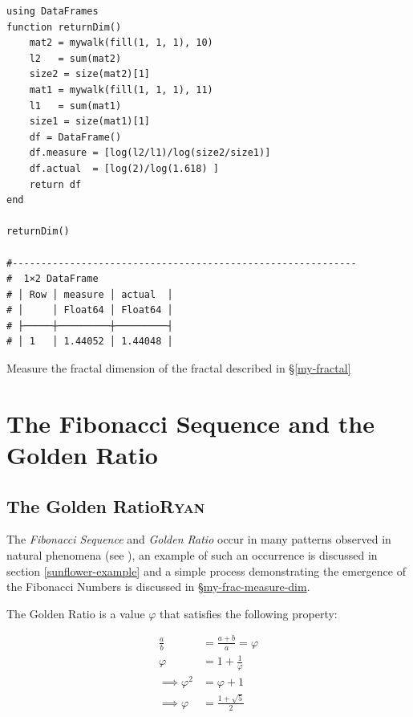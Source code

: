 \documentclass[a4paper,11pt,twoside]{article}
\begin{document}
\begin{listing}[htbp]
\begin{verbatim}
using DataFrames
function returnDim()
    mat2 = mywalk(fill(1, 1, 1), 10)
    l2   = sum(mat2)
    size2 = size(mat2)[1]
    mat1 = mywalk(fill(1, 1, 1), 11)
    l1   = sum(mat1)
    size1 = size(mat1)[1]
    df = DataFrame()
    df.measure = [log(l2/l1)/log(size2/size1)]
    df.actual  = [log(2)/log(1.618) ]
    return df
end

returnDim()

#------------------------------------------------------------
#  1×2 DataFrame
# │ Row │ measure │ actual  │
# │     │ Float64 │ Float64 │
# ├─────┼─────────┼─────────┤
# │ 1   │ 1.44052 │ 1.44048 │
\end{verbatim}
\caption{\label{my-frac-measure-dim}Measure the fractal dimension of the fractal described in \S \ref{my-fractal}}
\end{listing}

\section{The Fibonacci Sequence and the Golden Ratio}
\label{fib-golden-ratio-proof}
\subsection{The Golden Ratio\hfill{}\textsc{Ryan}}
\label{sec:org26dca1d}
The \emph{Fibonacci Sequence} and \emph{Golden Ratio} occur in many patterns observed
in natural phenomena (see
\cite{shellyallenFibonacciNature,benedettapalazzoNumbersNatureFibonacci2016,MinarovaNikoletta2014TFSN,NatureGoldenRatio2018,robertlambHowAreFibonacci2008,ronknottFibonacciNumbersGolden2016}),
an example of such an occurrence is discussed in section \ref{sunflower-example} and
a simple process demonstrating the emergence of the Fibonacci Numbers
is discussed in \S \hyperref[my-fractal]{my-frac-measure-dim}.

The Golden Ratio is a value \(\varphi\) that satisfies the following property:

\begin{align}
    \frac{a}{b} &=  \frac{a+  b}{a}= \varphi \nonumber \\
    \varphi &= 1+ \frac{1}{\varphi} \nonumber \\
    \implies  \varphi^2 &= \varphi +  1 \label{eq:phi-sim-to-fib-rec} \\
    \implies  \varphi &= \frac{1+ \sqrt{5} }{2} \label{eq:phi-value}
\end{align}
\end{document}
